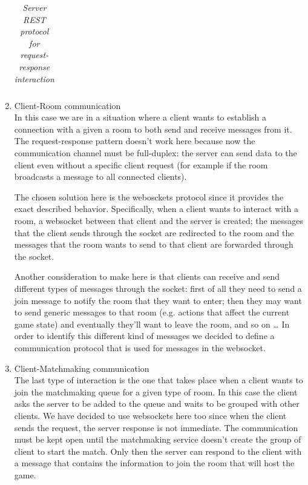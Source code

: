 \begin{enumerate}
\begin{table}[]
\begin{tabular}{p{2cm}p{4cm}p{2cm}p{5.5cm}}
		\end{tabular}
		\caption{\label{table:server_routes} \textit{Server REST protocol for request-response interaction}}
	\end{table}
	\item  Client-Room communication \\
	In this case we are in a situation where a client wants to establish a connection with a given a room to both send and receive messages from it. The request-response pattern doesn't work here because now the communication channel must be full-duplex: the server can send data to the client even without a specific client request (for example if the room broadcasts a message to all connected clients).
	
	The chosen solution here is the webosckets protocol since it provides the exact described behavior. Specifically, when a client wants to interact with a room, a websocket between that client and the server is created; the messages that the client sends through the socket are redirected to the room and the messages that the room wants to send to that client are forwarded through the socket. 
	
	Another consideration to make here is that clients can receive and send different types of messages through the socket: first of all they need to send a join message to notify the room that they want to enter; then they may want to send generic messages to that room (e.g. actions that affect the current game state) and eventually they'll want to leave the room, and so on \dots
	In order to identify this different kind of messages we decided to define a communication protocol that is used for messages in the websocket.
	
	
	\item Client-Matchmaking communication \\
	The last type of interaction is the one that takes place when a client wants to join the matchmaking queue for a given type of room. In this case the client asks the server to be added to the queue and waits to be grouped with other clients. We have decided to use websockets here too since when the client sends the request, the server response is not immediate. The communication must be kept open until the matchmaking service doesn't create the group of client to start the match. Only then the server can respond to the client with a message that contains the information to join the room that will host the game.
\end{enumerate}









